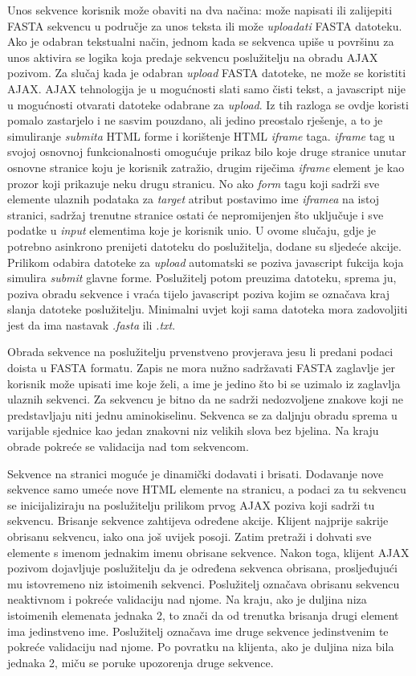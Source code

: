 Unos sekvence korisnik može obaviti na dva načina: može napisati ili zalijepiti
FASTA sekvencu u područje za unos teksta ili može \emph{uploadati} FASTA
datoteku. Ako je odabran tekstualni način, jednom kada se sekvenca upiše u
površinu za unos aktivira se logika koja predaje sekvencu poslužitelju na obradu
AJAX pozivom. Za slučaj kada je odabran \emph{upload} FASTA datoteke, ne može se
koristiti AJAX. AJAX tehnologija je u mogućnosti slati samo čisti tekst, a
javascript nije u mogućnosti otvarati datoteke odabrane za \emph{upload}. Iz tih
razloga se ovdje koristi pomalo zastarjelo i ne sasvim pouzdano, ali jedino
preostalo rješenje, a to je simuliranje \emph{submita} HTML forme i korištenje
HTML \emph{iframe} taga. \emph{iframe} tag u svojoj osnovnoj funkcionalnosti
omogućuje prikaz bilo koje druge stranice unutar osnovne stranice koju je
korisnik zatražio, drugim riječima \emph{iframe} element je kao prozor koji
prikazuje neku drugu stranicu. No ako \emph{form} tagu koji sadrži sve elemente
ulaznih podataka za \emph{target} atribut postavimo ime \emph{iframea} na istoj
stranici, sadržaj trenutne stranice ostati će nepromijenjen što uključuje i sve
podatke u \emph{input} elementima koje je korisnik unio. U ovome slučaju, gdje
je potrebno asinkrono prenijeti datoteku do poslužitelja, dodane su sljedeće
akcije. Prilikom odabira datoteke za \emph{upload} automatski se poziva
javascript fukcija koja simulira \emph{submit} glavne forme. Poslužitelj potom
preuzima datoteku, sprema ju, poziva obradu sekvence i vraća tijelo javascript
poziva kojim se označava kraj slanja datoteke poslužitelju. Minimalni uvjet koji
sama datoteka mora zadovoljiti jest da ima nastavak \emph{.fasta} ili
\emph{.txt}.

Obrada sekvence na poslužitelju prvenstveno provjerava jesu li predani podaci
doista u FASTA formatu. Zapis ne mora nužno sadržavati FASTA zaglavlje jer
korisnik može upisati ime koje želi, a ime je jedino što bi se uzimalo iz
zaglavlja ulaznih sekvenci. Za sekvencu je bitno da ne sadrži nedozvoljene
znakove koji ne predstavljaju niti jednu aminokiselinu. Sekvenca se za daljnju
obradu sprema u varijable sjednice kao jedan znakovni niz velikih slova bez
bjelina. Na kraju obrade pokreće se validacija nad tom sekvencom.

Sekvence na stranici moguće je dinamički dodavati i brisati. Dodavanje nove
sekvence samo umeće nove HTML elemente na stranicu, a podaci za tu sekvencu se
inicijaliziraju na poslužitelju prilikom prvog AJAX poziva koji sadrži tu
sekvencu. Brisanje sekvence zahtijeva određene akcije. Klijent najprije sakrije
obrisanu sekvencu, iako ona još uvijek posoji. Zatim pretraži i dohvati sve
elemente s imenom jednakim imenu obrisane sekvence. Nakon toga, klijent AJAX
pozivom dojavljuje poslužitelju da je određena sekvenca obrisana, prosljeđujući
mu istovremeno niz istoimenih sekvenci. Poslužitelj označava obrisanu sekvencu
neaktivnom i pokreće validaciju nad njome. Na kraju, ako je duljina niza
istoimenih elemenata jednaka 2, to znači da od trenutka brisanja drugi element
ima jedinstveno ime. Poslužitelj označava ime druge sekvence jedinstvenim te
pokreće validaciju nad njome. Po povratku na klijenta, ako je duljina niza bila
jednaka 2, miču se poruke upozorenja druge sekvence.

